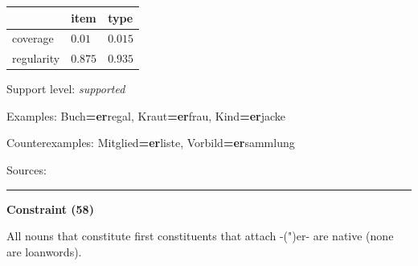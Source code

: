 \vspace{-0.25em}

\begin{table}[!ht]
\begin{center}
\setlength{\extrarowheight}{1pt}
\begin{tabularx}{\columnwidth}{|X|X|X|}
\hline
 & item & type \\
\hline
 coverage & $0.01$ & $0.015$ \\
\hline
 regularity & $0.875$ & $0.935$ \\
\hline
\end{tabularx}
\end{center}
\end{table}

\vspace{-1.35em}

\noindent
Support level: \textit{supported}

\vspace{0.3em}

\noindent
Examples: Buch\textbf{=er}regal, Kraut\textbf{=er}frau, Kind\textbf{=er}jacke

\noindent
Counterexamples: Mitglied\textbf{=er}liste, Vorbild\textbf{=er}sammlung

\vspace{0.3em}

\noindent
Sources: \citet[98]{ortner_mueller-bollhagen_1991}

\vspace{0.35em}
\hrule




\vspace{0.4em}

\begin{center}
\textbf{Constraint (58)}
\end{center}

\noindent
All nouns that constitute first constituents that attach -(")er- are native (none are loanwords).
\vspace{0.5em}


